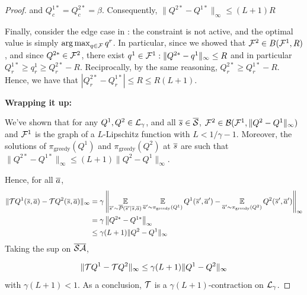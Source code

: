 \begin{proof}
and $Q_c^{1*} = Q_c^{2*} = \beta$.
Consequently, $ \|Q^{2*} - Q^{1*}\|_\infty \leq (L+1)R$

Finally, consider the edge case in : the constraint is not active, and the optimal value is simply $\operatorname*{arg\,max}_{q\in\mathcal{F}} q^r$. In particular, since we showed that $\mathcal{F}^2\in B(\mathcal{F}^1, R)$, and since $Q^{2*}\in \mathcal{F}^2$, there exist $q^1\in \mathcal{F}^1: \|Q^{2*}-q^1\|_\infty\leq R$ and in particular $Q^{1*}_r \geq q^1_r \geq Q^{2*}_r - R$. Reciprocally, by the same reasoning, $Q^{2*}_r \geq Q^{1*}_r - R$. Hence, we have that $| Q_r^{2*} - Q_r^{1*}| \leq R \leq R(L+1).$

\textbf{Wrapping it up:}

We've shown that for any $Q^1,Q^2\in\mathcal{L}_\gamma$, and all $\overline{s}\in\overline{\mathcal{S}}$, $\mathcal{F}^2\in\mathcal{B}(\mathcal{F}^1,\|Q^2-Q^1\|_\infty)$ and $\mathcal{F}^1$ is the graph of a $L$-Lipschitz function with $L<1/\gamma - 1$. Moreover, the solutions of $\pi_\text{greedy}(Q^1)$ and $\pi_\text{greedy}(Q^2)$ at $\overline{s}$ are such that $ \|Q^{2*} - Q^{1*}\|_\infty \leq (L+1)\|Q^2-Q^1\|_\infty$.

Hence, for all $\overline{a}$,
\begin{align*}
    \|\mathcal{T} Q^1(\overline{s}, \overline{a}) - \mathcal{T} Q^2(\overline{s}, \overline{a})\|_\infty &= \gamma\left\|\operatorname*{\mathbb{E}}\limits_{\overline{s}'\sim\overline{P}(\overline{s}'|\overline{s},\overline{a})} \operatorname*{\mathbb{E}}\limits_{\overline{a}'\sim\pi_\text{greedy}(Q^1)}Q^1(\overline{s}',\overline{a}') - \operatorname*{\mathbb{E}}\limits_{\overline{a}'\sim\pi_\text{greedy}(Q^2)}Q^2(\overline{s}',\overline{a}')\right\|_\infty \\
    &= \gamma\left\|Q^{2*} - Q^{1*}\right\|_\infty \\
    &\leq \gamma(L+1)\|Q^2-Q^1\|_\infty
\end{align*}
Taking the sup on $\overline{\mathcal{S}}\overline{\mathcal{A}}$,

\begin{equation*}
    \|\mathcal{T} Q^1 - \mathcal{T} Q^2\|_\infty \leq \gamma(L+1)\|Q^1-Q^2\|_\infty
\end{equation*}
with $\gamma(L+1) < 1$.
As a conclusion, $\mathcal{T}$ is a $\gamma(L+1)$-contraction on $\mathcal{L}_\gamma$.
\end{proof}




